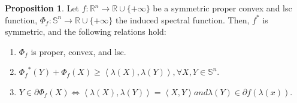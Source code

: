 \documentclass[a4paper,11pt, oneside]{book}
\theoremstyle{definition}
\newtheorem{prop}[dfn]{Proposition}
\newcommand{\RealNumberSet}{\mathbb{R}}
\newcommand{\NDemenstionalRealEuclideanSpace}{\mathbb{R}^n}
\newcommand{\NDemenstionalRealSymmetricMatrixSpace}{\mathbb{S}^n}
\newcommand{\InnerProduct}[2]{\left\langle {#1},{#2}\right\rangle} %
\newcommand{\ExtendedRealValuedFunction}[2]{{#1}: {#2} \to \RealNumberSet \cup \{+\infty\}}
\newcommand{\ConjugateFunction}[1]{{#1}^*}
\begin{document}
\begin{prop}
  Let $\ExtendedRealValuedFunction{f}{\NDemenstionalRealEuclideanSpace}$ be a symmetric proper convex and lsc function, $\ExtendedRealValuedFunction{\Phi_f}{\NDemenstionalRealSymmetricMatrixSpace}$ the induced spectral function. Then, $\ConjugateFunction{f}$ is symmetric, and the following relations hold:
  \begin{enumerate}[label=\roman*,align=CenterWithParen]
    \item $\Phi_{f}$ is proper, convex, and lsc.
    \item $\ConjugateFunction{\Phi_f}(Y) + \Phi_f(X) \geq \InnerProduct{\lambda(X)}{\lambda(Y)}, \forall X,Y \in \NDemenstionalRealSymmetricMatrixSpace$.
    \item $Y \in \partial \Phi_f(X) \Leftrightarrow \InnerProduct{\lambda(X)}{\lambda(Y)} = \InnerProduct{X}{Y} and \lambda(Y) \in \partial f(\lambda(x))$.
  \end{enumerate}
\end{prop}
\end{document}
